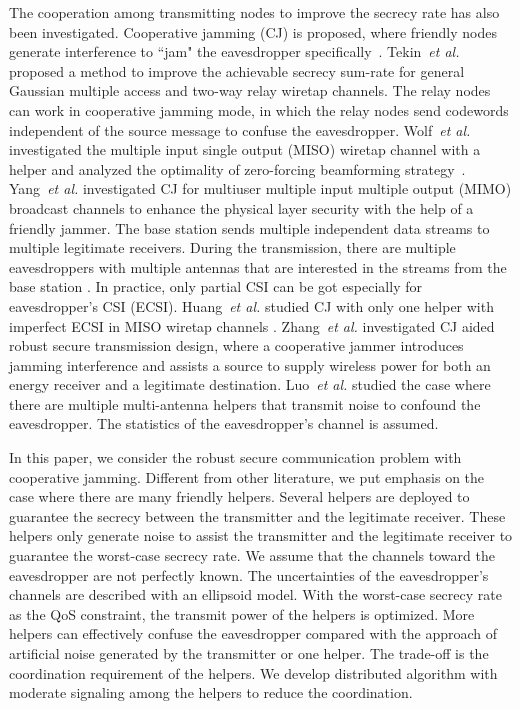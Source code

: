 \documentclass[journal]{IEEEtran}
\begin{document}
The cooperation among transmitting nodes to improve the secrecy rate has also been investigated. Cooperative jamming (CJ) is proposed, where friendly nodes generate interference to ``jam" the eavesdropper specifically~\cite{tekin2008general,lai2008relay,li2011cooperative,wolf_zero_2010,pei_adaptive_2014,yang_optimal_2013,ding_opportunistic_2011,park_jamming_2013}. Tekin~\emph{et al.} proposed a method to improve the achievable secrecy sum-rate for general Gaussian multiple access and two-way relay wiretap channels\cite{tekin2008general}. The relay nodes can work in cooperative jamming mode, in which the relay nodes send codewords independent of the source message to confuse the eavesdropper\cite{lai2008relay,li2011cooperative}. Wolf~\emph{et al.} investigated the multiple input single output (MISO) wiretap channel with a helper and analyzed the optimality of zero-forcing beamforming strategy~\cite{wolf_zero_2010}. Yang~\emph{et al.} investigated CJ for multiuser multiple input multiple output (MIMO) broadcast channels to enhance the physical layer security with the help of a friendly jammer. The base station sends multiple independent data streams to multiple legitimate receivers. During the transmission, there are multiple eavesdroppers with multiple antennas that are interested in the streams from the base station \cite{yang_optimal_2013}. In practice, only partial CSI can be got especially for eavesdropper's CSI (ECSI). Huang~\emph{et al.} studied CJ with only one helper with imperfect ECSI in MISO wiretap channels \cite{huang_robust_2012}. Zhang~\emph{et al.} investigated CJ aided robust secure transmission design, where a cooperative jammer introduces jamming interference and assists a source to supply wireless power for both an energy receiver and a legitimate destination\cite{Zhang_Cooperative2015}. Luo~\emph{et al.} studied the case where there are multiple multi-antenna helpers that transmit noise to confound the eavesdropper. The statistics of the eavesdropper's channel is assumed\cite{luo_uncoordinated_2013}.

In this paper, we consider the robust secure communication problem with cooperative jamming. Different from other literature, we put emphasis on the case where there are many friendly helpers. Several helpers are deployed to guarantee the secrecy between the transmitter and the legitimate receiver. These helpers only generate noise to assist the transmitter and the legitimate receiver to guarantee the worst-case secrecy rate. We assume that the channels toward the eavesdropper are not perfectly known. The uncertainties of the eavesdropper's channels are described with an ellipsoid model. With the worst-case secrecy rate as the QoS constraint, the transmit power of the helpers is optimized. More helpers can effectively confuse the eavesdropper compared with the approach of artificial noise generated by the transmitter or one helper. The trade-off is the coordination requirement of the helpers. We develop distributed algorithm with moderate signaling among the helpers to reduce the coordination.
\end{document}
